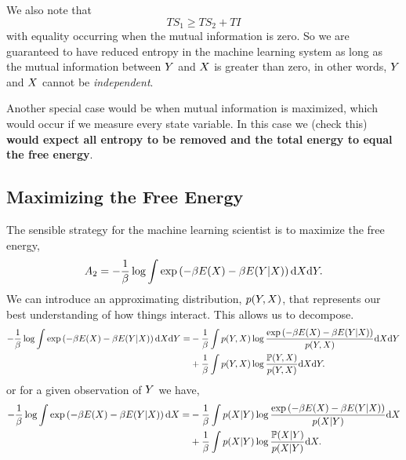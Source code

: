 \documentclass[]{article}
\begin{document}
We also note that 
\[
TS_1  \geq TS_2 + TI
\] 
with equality occurring when the mutual information is zero. So we are
guaranteed to have reduced entropy in the machine learning system as
long as the mutual information between \(Y\) and
\(X\) is greater than zero, in other words,
\(Y\) and \(X\) cannot be \emph{independent}.

Another special case would be when mutual information is maximized,
which would occur if we measure every state variable. In this case we
(check this) \textbf{would expect all entropy to be removed and the
total energy to equal the free energy}.

\subsection{Maximizing the Free Energy}\label{maximizing-the-free-energy}

The sensible strategy for the machine learning scientist is to maximize
the free energy, 
\[
A_2 = -\frac{1}{\beta} \log \int \exp \left(-\beta E(X) -\beta E(Y | X)\right) \text{d}X \text{d}Y.
\] 
We can introduce an approximating distribution,
\(p(Y, X)\), that represents our best
understanding of how things interact. This allows us to decompose. 
\begin{align*}
-\frac{1}{\beta} \log \int \exp \left(-\beta E(X) -\beta E(Y | X)\right) \text{d}X \text{d}Y = & -\frac{1}{\beta} \int p(Y, X) \log \frac{\exp\left(-\beta E(X) -\beta E(Y | X)\right)}{p(Y, X)}\text{d}X \text{d}Y \\
& +\frac{1}{\beta} \int p(Y, X) \log \frac{\mathbb{P}(Y, X)}{p(Y, X)}\text{d}X \text{d}Y. \\
\end{align*}
or for a given observation of \(Y\) we have, 
\begin{align*}
-\frac{1}{\beta} \log \int \exp \left(-\beta E(X) -\beta E(Y | X)\right) \text{d}X  = & -\frac{1}{\beta} \int p(X| Y) \log \frac{\exp\left(-\beta E(X) -\beta E(Y | X)\right)}{p( X| Y)}\text{d}X  \\
& +\frac{1}{\beta} \int p(X |Y) \log \frac{\mathbb{P}(X| Y)}{p(X | Y)}\text{d}X. \\
\end{align*}
\end{document}
